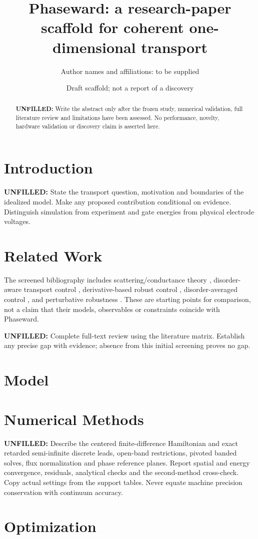 \documentclass[11pt]{article}
\title{Phaseward: a research-paper scaffold for coherent one-dimensional transport}
\author{Author names and affiliations: to be supplied}
\date{Draft scaffold; not a report of a discovery}
\newcommand{\pending}[1]{\par\noindent\textbf{UNFILLED:} #1\par}
\begin{document}
\maketitle
\begin{abstract}
\pending{Write the abstract only after the frozen study, numerical validation,
full literature review and limitations have been assessed. No performance,
novelty, hardware validation or discovery claim is asserted here.}
\end{abstract}
\section{Introduction}
\pending{State the transport question, motivation and boundaries of the idealized
model. Make any proposed contribution conditional on evidence. Distinguish
simulation from experiment and gate energies from physical electrode voltages.}
\section{Related Work}
The screened bibliography includes scattering/conductance theory
\cite{fisher1981}, disorder-aware transport control \cite{coopmans2022},
derivative-based robust control \cite{propson2022}, disorder-averaged control
\cite{araki2023}, and perturbative robustness \cite{poggi2024}.
These are starting points for comparison, not a claim that their models,
observables or constraints coincide with Phaseward.
\pending{Complete full-text review using the literature matrix. Establish any
precise gap with evidence; absence from this initial screening proves no gap.}
\section{Model}

\section{Numerical Methods}
\pending{Describe the centered finite-difference Hamiltonian and exact retarded
semi-infinite discrete leads, open-band restrictions, pivoted banded solves,
flux normalization and phase reference planes. Report spatial and energy
convergence, residuals, analytical checks and the second-method cross-check.
Copy actual settings from the support tables. Never equate machine precision
conservation with continuum accuracy.}
\section{Optimization}

\end{document}
